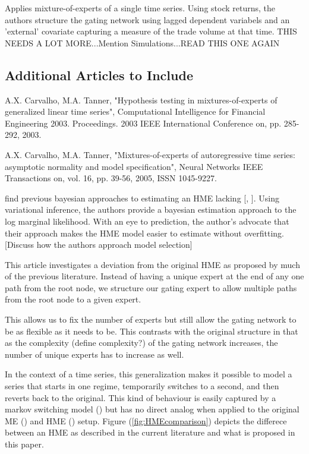 \documentclass[12pt]{article}
\begin{document}
\cite{CarvalhoSkoulakis2010} Applies mixture-of-experts of a single time series.
Using stock returns, the authors structure the gating network using lagged
dependent variabels and an 'external' covariate capturing a measure of the
trade volume at that time. THIS NEEDS A LOT MORE...Mention Simulations...READ 
THIS ONE AGAIN




\subsection{Additional Articles to Include}

A.X. Carvalho, M.A. Tanner, "Hypothesis testing in mixtures-of-experts of generalized linear time series", Computational Intelligence for Financial Engineering 2003. Proceedings. 2003 IEEE International Conference on, pp. 285-292, 2003.

A.X. Carvalho, M.A. Tanner, "Mixtures-of-experts of autoregressive time series: asymptotic normality and model specification", Neural Networks IEEE Transactions on, vol. 16, pp. 39-56, 2005, ISSN 1045-9227. 

\cite{UedaGhahramani2002}

\cite{BishopSvenson2003} find previous bayesian approaches to estimating an HME
lacking [\cite{HuertaJiangTanner2003}, \cite{UedaGhahramani2002}]. Using
variational inference, the authors provide a bayesian estimation approach
to the log marginal likelihood. With an eye to prediction, the author's advocate
that their approach makes the HME model easier to estimate without overfitting.
[Discuss how the authors approach model selection]


\cite{CarvalhoSkoulakis2005}

\bigskip

This article investigates a deviation from the original HME as proposed by
much of the previous literature. Instead of having a unique expert at the 
end of any one path from the root node, we structure our gating expert to 
allow multiple paths from the root node to a given expert. 

This allows us to fix the number of experts but still allow the gating network
to be as flexible as it needs to be. This contrasts with the original structure
in that as the complexity (define complexity?) of the gating network increases,
the number of unique experts has to increase as well.

In the context of a time series, this generalization makes it possible to
model a series that starts in one regime, temporarily switches to a second,
and then reverts back to the original. This kind of behaviour is easily captured
by a markov switching model (\cite{Hamilton1989}) but has no direct analog
when applied to the original ME (\cite{WMS1995}) and HME
(\cite{HuertaJiangTanner2003}) setup. Figure
(\ref{fig:HMEcomparison}) depicts the differece between an HME as described
in the current literature and what is proposed in this paper.
\end{document}
